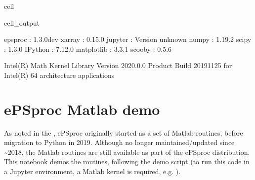 \documentclass[letterpaper,10pt,english]{jupyterBook}
\begin{document}
\begin{sphinxuseclass}{cell}
\begin{sphinxVerbatimOutput}
\begin{sphinxuseclass}{cell_output}
\begin{sphinxVerbatim}[commandchars=\\\{\}]
           epsproc : 1.3.0\PYGZhy{}dev
            xarray : 0.15.0
           jupyter : Version unknown
             numpy : 1.19.2
             scipy : 1.3.0
           IPython : 7.12.0
        matplotlib : 3.3.1
            scooby : 0.5.6

  Intel(R) Math Kernel Library Version 2020.0.0 Product Build 20191125 for
  Intel(R) 64 architecture applications
\PYGZhy{}\PYGZhy{}\PYGZhy{}\PYGZhy{}\PYGZhy{}\PYGZhy{}\PYGZhy{}\PYGZhy{}\PYGZhy{}\PYGZhy{}\PYGZhy{}\PYGZhy{}\PYGZhy{}\PYGZhy{}\PYGZhy{}\PYGZhy{}\PYGZhy{}\PYGZhy{}\PYGZhy{}\PYGZhy{}\PYGZhy{}\PYGZhy{}\PYGZhy{}\PYGZhy{}\PYGZhy{}\PYGZhy{}\PYGZhy{}\PYGZhy{}\PYGZhy{}\PYGZhy{}\PYGZhy{}\PYGZhy{}\PYGZhy{}\PYGZhy{}\PYGZhy{}\PYGZhy{}\PYGZhy{}\PYGZhy{}\PYGZhy{}\PYGZhy{}\PYGZhy{}\PYGZhy{}\PYGZhy{}\PYGZhy{}\PYGZhy{}\PYGZhy{}\PYGZhy{}\PYGZhy{}\PYGZhy{}\PYGZhy{}\PYGZhy{}\PYGZhy{}\PYGZhy{}\PYGZhy{}\PYGZhy{}\PYGZhy{}\PYGZhy{}\PYGZhy{}\PYGZhy{}\PYGZhy{}\PYGZhy{}\PYGZhy{}\PYGZhy{}\PYGZhy{}\PYGZhy{}\PYGZhy{}\PYGZhy{}\PYGZhy{}\PYGZhy{}\PYGZhy{}\PYGZhy{}\PYGZhy{}\PYGZhy{}\PYGZhy{}\PYGZhy{}\PYGZhy{}\PYGZhy{}\PYGZhy{}\PYGZhy{}\PYGZhy{}
\end{sphinxVerbatim}

\end{sphinxuseclass}\end{sphinxVerbatimOutput}

\end{sphinxuseclass}

\section{ePSproc Matlab demo}
\label{\detokenize{testChpt/ePSproc_Matlab_demo_notebook_090821:epsproc-matlab-demo}}\label{\detokenize{testChpt/ePSproc_Matlab_demo_notebook_090821::doc}}
\sphinxAtStartPar
As noted in the , ePSproc originally started as a set of Matlab routines, before migration to Python in 2019. Although no longer maintained/updated since \textasciitilde{}2018, the Matlab routines are still available as part of the ePSproc distribution. This notebook demos the routines, following the demo script  (to run this code in a Jupyter environment, a Matlab kernel is required, e.g. ).
\end{document}
